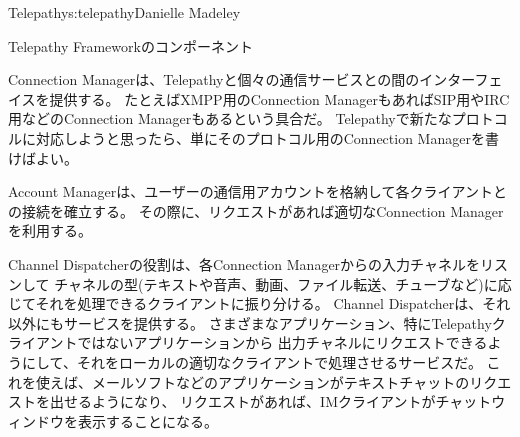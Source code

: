 \begin{aosachapter}{Telepathy}{s:telepathy}{Danielle Madeley}
\begin{aosasect1}{Telepathy Frameworkのコンポーネント}
\begin{aosaitemize}
  \item Connection Managerは、Telepathyと個々の通信サービスとの間のインターフェイスを提供する。
  たとえばXMPP用のConnection ManagerもあればSIP用やIRC用などのConnection Managerもあるという具合だ。
  Telepathyで新たなプロトコルに対応しようと思ったら、単にそのプロトコル用のConnection Managerを書けばよい。

  \item Account Managerは、ユーザーの通信用アカウントを格納して各クライアントとの接続を確立する。
  その際に、リクエストがあれば適切なConnection Managerを利用する。

  \item Channel Dispatcherの役割は、各Connection Managerからの入力チャネルをリスンして
  チャネルの型(テキストや音声、動画、ファイル転送、チューブなど)に応じてそれを処理できるクライアントに振り分ける。
  Channel Dispatcherは、それ以外にもサービスを提供する。
  さまざまなアプリケーション、特にTelepathyクライアントではないアプリケーションから
  出力チャネルにリクエストできるようにして、それをローカルの適切なクライアントで処理させるサービスだ。
  これを使えば、メールソフトなどのアプリケーションがテキストチャットのリクエストを出せるようになり、
  リクエストがあれば、IMクライアントがチャットウィンドウを表示することになる。


\end{aosaitemize}
\end{aosasect1}
\end{aosachapter}
